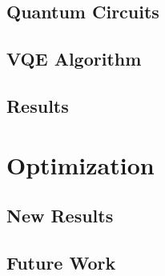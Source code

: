 \documentclass[9pt, handout, aspectratio=169]{beamer}		%
\begin{document}
	\subsection{Quantum Circuits}
	

	\subsection{VQE Algorithm}
	

	\subsection{Results}
	

\section{Optimization}


	\subsection{New Results}
	

	\subsection{Future Work}
	
	
\end{document}
